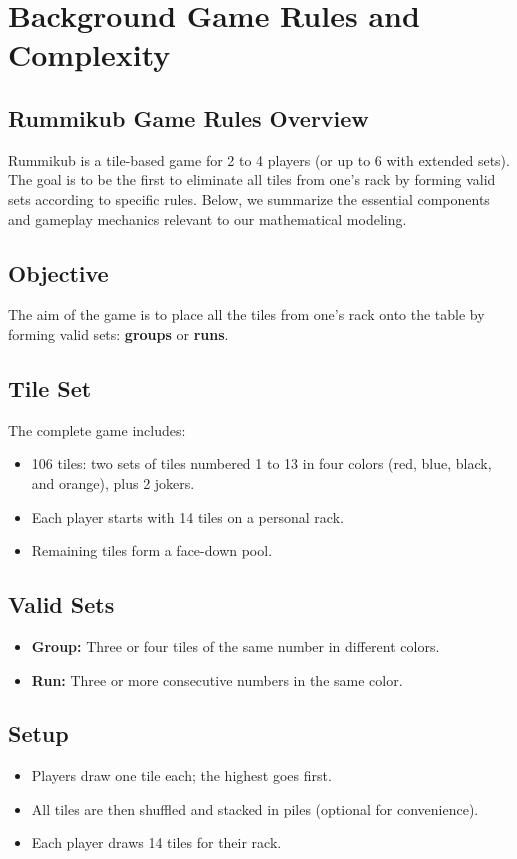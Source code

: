\documentclass[11pt,letterpaper]{article}
\begin{document}
\section*{Background Game Rules and Complexity}
\subsection*{Rummikub Game Rules Overview}
Rummikub is a tile-based game for 2 to 4 players (or up to 6 with extended sets). The goal is to be the first to eliminate all tiles from one's rack by forming valid sets according to specific rules. Below, we summarize the essential components and gameplay mechanics relevant to our mathematical modeling.

\subsection*{Objective}
The aim of the game is to place all the tiles from one's rack onto the table by forming valid sets: \textbf{groups} or \textbf{runs}.

\subsection*{Tile Set}
The complete game includes:
\begin{itemize}
    \item 106 tiles: two sets of tiles numbered 1 to 13 in four colors (red, blue, black, and orange), plus 2 jokers.
    \item Each player starts with 14 tiles on a personal rack.
    \item Remaining tiles form a face-down pool.
\end{itemize}

\subsection*{Valid Sets}
\begin{itemize}
    \item \textbf{Group:} Three or four tiles of the same number in different colors.
    \item \textbf{Run:} Three or more consecutive numbers in the same color.
\end{itemize}

\subsection*{Setup}
\begin{itemize}
    \item Players draw one tile each; the highest goes first.
    \item All tiles are then shuffled and stacked in piles (optional for convenience).
    \item Each player draws 14 tiles for their rack.
\end{itemize}
\end{document}
